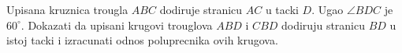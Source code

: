 \problem
Upisana kruznica trougla $ABC$ dodiruje stranicu $AC$ u tacki $D$.
Ugao $\angle{BDC}$ je $60^{\circ}$.
Dokazati da upisani krugovi trouglova $ABD$ i $CBD$ dodiruju stranicu $BD$ u istoj tacki i izracunati odnos poluprecnika ovih krugova.
\solution
\endproblem
